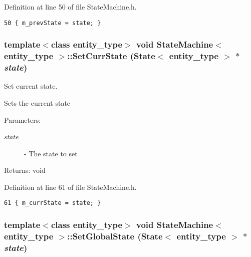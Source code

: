Definition at line 50 of file StateMachine.h.

\begin{Code}\begin{verbatim}50 { m_prevState = state; }
\end{verbatim}
\end{Code}


\hypertarget{class_state_machine_9411020a1ab0a925142bf615550a034d}{
\subsubsection[SetCurrState]{\setlength{\rightskip}{0pt plus 5cm}template$<$class entity\_\-type$>$ void {\bf StateMachine}$<$ entity\_\-type $>$::SetCurrState ({\bf State}$<$ entity\_\-type $>$ $\ast$ {\em state})}}
\label{class_state_machine_9411020a1ab0a925142bf615550a034d}


Set current state. 

Sets the current state

\begin{Desc}
\item[Parameters:]
\begin{description}
\item[{\em state}]- The state to set\end{description}
\end{Desc}
\begin{Desc}
\item[Returns:]void \end{Desc}


Definition at line 61 of file StateMachine.h.

\begin{Code}\begin{verbatim}61 { m_currState = state; }
\end{verbatim}
\end{Code}


\hypertarget{class_state_machine_1236ff308ac7428c32703a5f77cbf3d7}{
\subsubsection[SetGlobalState]{\setlength{\rightskip}{0pt plus 5cm}template$<$class entity\_\-type$>$ void {\bf StateMachine}$<$ entity\_\-type $>$::SetGlobalState ({\bf State}$<$ entity\_\-type $>$ $\ast$ {\em state})}}
\label{class_state_machine_1236ff308ac7428c32703a5f77cbf3d7}


